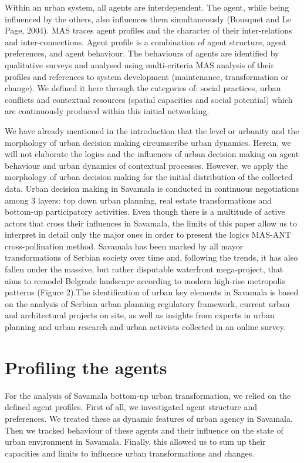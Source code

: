 \documentclass[11pt]{report}
\begin{document}
Within an urban system, all agents are interdependent. The agent, while being influenced by the others, also influences them simultaneously (Bousquet and Le Page, 2004). MAS traces agent profiles and the character of their inter-relations and inter-connections. Agent profile is a combination of agent structure, agent preferences, and agent behaviour. The behaviours of agents are identified by qualitative surveys and analysed using multi-criteria MAS analysis of their profiles and references to system development (maintenance, transformation or change). We defined it here through the categories of: social practices, urban conflicts and contextual resources (spatial capacities and social potential) which are continuously produced within this initial networking.

We have already mentioned in the introduction that the level or urbanity and the morphology of urban decision making circumscribe urban dynamics. Herein, we will not elaborate the logics and the influences of urban decision making on agent behaviour and urban dynamics of contextual processes. However, we apply the morphology of urban decision making for the initial distribution of the collected data. Urban decision making in Savamala is conducted in continuous negotiations among 3 layers: top down urban planning, real estate transformations and bottom-up participatory activities. Even though there is a multitude of active actors that cross their influences in Savamala, the limits of this paper allow us to interpret in detail only the major ones in order to present the logics MAS-ANT cross-pollination method. Savamala has been marked by all mayor transformations of Serbian society over time and, following the trends, it has also fallen under the massive, but rather disputable waterfront mega-project, that aims to remodel Belgrade landscape according to modern high-rise metropolis patterns (Figure 2).The identification of urban key elements in Savamala is based on the analysis of Serbian urban planning regulatory framework, current urban and architectural projects on site, as well as insights from experts in urban planning and urban research and urban activists collected in an online survey.

\section{Profiling the agents}

For the analysis of Savamala bottom-up urban transformation, we relied on the defined agent profiles. First of all, we investigated agent structure and preferences. We treated these as dynamic features of urban agency in Savamala. Then we tracked behaviour of these agents and their influence on the state of urban environment in Savamala. Finally, this allowed us to sum up their capacities and limits to influence urban transformations and changes.
\end{document}
